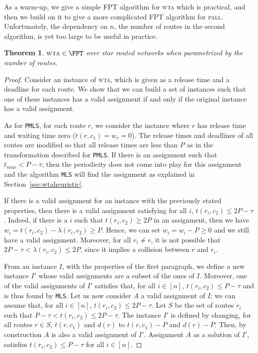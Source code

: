 \documentclass[a4paper,10pt]{journal}
\newcommand\MLS{\texttt{MLS}\xspace}
\newcommand\PMLS{\texttt{PMLS}\xspace}
\newtheorem{theorem}{Theorem}
\newcommand\pall{\textsc{pall}\xspace}
\newcommand\wta{\textsc{wta}\xspace}
\begin{document}
As a warm-up, we give a simple FPT algorithm for \wta which is practical,
and then we build on it to give a more complicated FPT algorithm for \pall. Unfortunately, the dependency on $n$, the number of routes in the second algorithm, is yet too large to be useful in practice. 

\begin{theorem}\label{th:braFPT}
$\wta \in \FPT$ over star routed networks when parametrized by the number of routes.
\end{theorem}
\begin{proof}
 Consider an instance of \wta, which is given as a release time and a deadline for each route.
 We show that we can build a set of instances such that one of these instances has a valid assignment if and only if the original instance has a valid assignment.

  As for \PMLS, for each route $r$, we consider the instance where $r$ has release time and waiting time zero ($t(r,c_1) = w_r = 0$). The release times and deadlines of all routes are modified so that all release times are less than $P$ as in the transformation described for \PMLS. If there is an assignment such that $t_{max} < P-\tau$, then the periodicity does not come into play for this assignment and the algorithm \MLS will find the assignment as explained in Section~\ref{sec:wtaheuristic}.

 If there is a valid assignment for an instance with the previously stated properties,
 then there is a valid assignment satisfying for all $i$, $t(r_i,c_2) \leq 2P - \tau$.  
 Indeed, if there is a $i$ such that $t(r_i,c_2) \geq 2P$ in an assignment, then we have 
 $w_i = t(r_i,c_2) - \lambda(r_i,c_2) \geq P$. Hence, we can set $w_i = w_i -P \geq 0$ and we still have 
 a valid assignment. Moreover, for all $r_i \neq r$, it is not possible that $2P-\tau < \lambda(r_i,c_2) \leq 2P$, since it implies a collision between $r$ and $r_i$.
 

From an instance $I$, with the properties of the first paragraph, we define a new instance $I'$ whose valid assignments are a subset of the ones of $I$. Moreover, one of the valid assignments of $I'$ satisfies that, for all $i \in [n]$, $t(r_i,c_2) \leq P - \tau$ and is thus found by \MLS. 
Let us now consider $A$ a valid assignment of $I$; we can assume that, for all $i \in [n]$, $t(r_i,c_2) \leq 2P - \tau$. Let $S$ be the set of routes $r_i$ such that  $P - \tau < t(r_i,c_2) \leq 2P - \tau$. The instance $I'$ is defined by changing, for all routes $r \in S$, $t(r,c_1)$ and $d(r)$ to $t(r,c_1) - P$ and $d(r) - P$. Then, by construction $A$ is also a valid assignment of $I'$. Assignment $A$ as a solution of $I'$, satisfies $t(r_i,c_2) \leq P - \tau$ for all $i\in [n]$. 


\end{proof}
\end{document}
